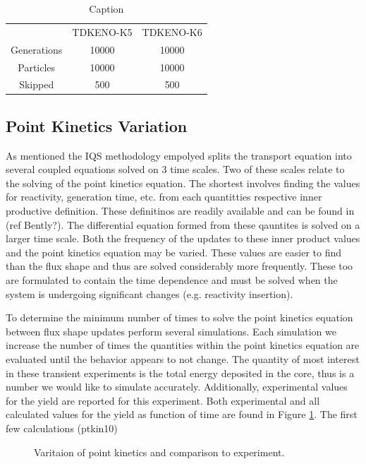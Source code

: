 \documentclass{anstrans}
\begin{document}
\begin{table}[h]
    \centering
    \begin{tabular}{c|c|c}
         & TDKENO-K5 & TDKENO-K6 \\
        Generations &  10000 & 10000 \\
        Particles   &  10000 & 10000 \\
        Skipped     &  500   & 500  \\
    \end{tabular}
    \caption{Caption}
    \label{tab:my_label}
\end{table}

\subsection{Point Kinetics Variation}
As mentioned the IQS methodology empolyed splits the transport equation into several coupled equations solved on 3 time scales.  Two of these scales relate to the solving of the point kinetics equation.  The shortest involves finding the values for reactivity, generation time, etc. from each quantitties respective inner productive definition.  These definitinos are readily available and can be found in (ref Bently?).  The differential equation formed from these qauntites is solved on a larger time scale.  Both the frequency of the updates to these inner product values and the point kinetics equation may be varied. These values are easier to find than the flux shape and thus are solved considerably more frequently. These too are formulated to contain the time dependence and must be solved when the system is undergoing significant changes (e.g. reactivity insertion). 

To determine the minimum number of times to solve the point kinetics equation between flux shape updates perform several simulations.  Each simulation we increase the number of times the quantities within the point kinetics equation are evaluated until the behavior appears to not change.  The quantity of most interest in these transient experiments is the total energy deposited in the core, thus is a number we would like to simulate accurately.  Additionally, experimental values for the yield are reported for this experiment.  Both experimental and all calculated values for the yield as function of time are found in Figure \ref{fig:var_pt_kin}.  The first few calculations (ptkin10)  

\begin{figure}
\label{fig:var_pt_kin}

\caption{Varitaion of point kinetics and comparison to experiment.}

\end{figure}
\end{document}
